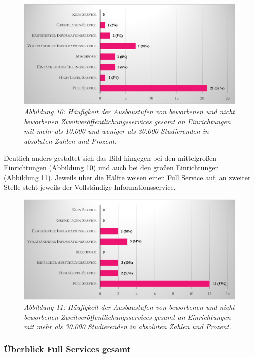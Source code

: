 \documentclass[a4paper,
fontsize=11pt,
oneside,
numbers=noperiodatend,
parskip=half-,
bibliography=totoc,
final
]{scrartcl}
\begin{document}
\begin{figure}[h!]
\centering
\includegraphics[width=.9\textwidth]{img/abb10.png}
\caption{\textit{Abbildung 10: Häufigkeit der Ausbaustufen von beworbenen und
nicht beworbenen Zweitveröffentlichungsservices gesamt an Einrichtungen
mit mehr als 10.000 und weniger als 30.000 Studierenden in absoluten
Zahlen und Prozent.}}
\end{figure}

Deutlich anders gestaltet sich das Bild hingegen bei den mittelgroßen
Einrichtungen (Abbildung 10) und auch bei den großen Einrichtungen
(Abbildung 11). Jeweils über die Hälfte weisen einen Full Service auf,
an zweiter Stelle steht jeweils der Vollständige Informationsservice.

\begin{figure}[h!]
\centering
\includegraphics[width=.9\textwidth]{img/abb11.png}
\caption{\textit{Abbildung 11: Häufigkeit der Ausbaustufen von beworbenen und
nicht beworbenen Zweitveröffentlichungsservices gesamt an Einrichtungen
mit mehr als 30.000 Studierenden in absoluten Zahlen und Prozent.}}
\end{figure}

\hypertarget{uxfcberblick-full-services-gesamt}{%
\subsubsection{Überblick Full Services
gesamt}\label{uxfcberblick-full-services-gesamt}}
\end{document}
